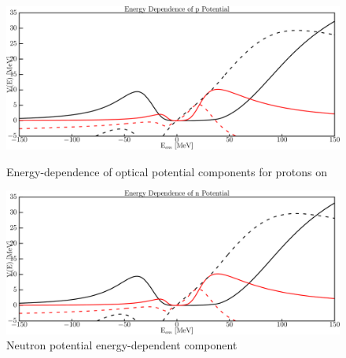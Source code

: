 \begin{figure}[H]
    \centering
    \begin{minipage}{0.45\textwidth}
        \centering
        \includegraphics[width=1.0\textwidth]{figures/o16_protonPotentials.png}
        \caption{Energy-dependence of optical potential components for protons
        on \oSix}
        \label{DOMFitData_o16_proton_potentialComponent_energy}
    \end{minipage}\hfill
    \begin{minipage}{0.45\textwidth}
        \centering
        \includegraphics[width=1.0\textwidth]{figures/o16_neutronPotentials.png}
        \caption{Neutron potential energy-dependent component}
        \label{DOMFitData_o16_neutron_potentialComponent_energy}
    \end{minipage}
\end{figure}

